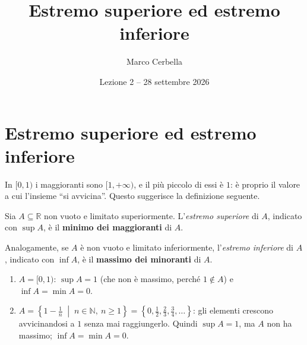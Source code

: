 \documentclass[11pt,a4paper]{article}
\title{Estremo superiore ed estremo inferiore}
\author{Marco Cerbella}
\date{Lezione 2 -- 28 settembre 2026}
\begin{document}
\maketitle

\section{Estremo superiore ed estremo inferiore}

In $[0, 1)$ i maggioranti sono $[1, +\infty)$, e il più piccolo di essi è
$1$: è proprio il valore a cui l'insieme ``si avvicina''. Questo suggerisce
la definizione seguente.

\begin{definizione}
Sia $A \subseteq \mathbb{R}$ non vuoto e limitato superiormente.
L'\emph{estremo superiore} di $A$, indicato con $\sup A$, è il
\textbf{minimo dei maggioranti} di $A$.

Analogamente, se $A$ è non vuoto e limitato inferiormente, l'\emph{estremo
inferiore} di $A$, indicato con $\inf A$, è il \textbf{massimo dei
minoranti} di $A$.
\end{definizione}

\begin{center}
\end{center}

\begin{esempio}
\leavevmode
\begin{enumerate}
    \item $A = [0, 1)$: $\sup A = 1$ (che non è massimo, perché $1 \notin A$)
          e $\inf A = \min A = 0$.
    \item $A = \left\{ 1 - \frac{1}{n} \;\middle|\; n \in \mathbb{N},\
          n \geq 1 \right\} = \left\{ 0, \frac12, \frac23, \frac34, \dots
          \right\}$: gli elementi crescono avvicinandosi a $1$ senza mai
          raggiungerlo. Quindi $\sup A = 1$, ma $A$ non ha massimo;
          $\inf A = \min A = 0$.
\end{enumerate}
\end{esempio}
\end{document}
